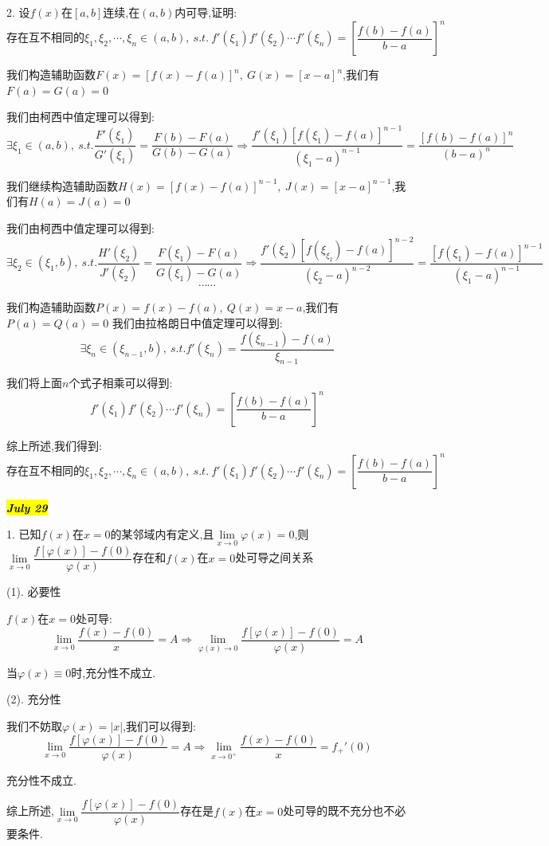 2. 设$f(x)$在$[a,b]$连续,在$(a,b)$内可导,证明: $$\text{存在互不相同的}\xi_{1},\xi_{2},\cdots,\xi_{n}\in(a,b),\ s.t. \ f'(\xi_{1})f'(\xi_{2})\cdots f'(\xi_{n})=\left[ \dfrac{f(b)-f(a)}{b-a}\right]^{n}$$
\begin{solution}
	
	我们构造辅助函数$F(x)=\left[ f(x)-f(a)\right]^n,\ G(x)=\left[ x-a\right]^n $,我们有$F(a)=G(a)=0$
	
	我们由柯西中值定理可以得到: 
	$$\exists \xi_{1}\in(a,b),\ s.t. \dfrac{F'(\xi_{1})}{G'(\xi_{1})}=\dfrac{F(b)-F(a)}{G(b)-G(a)}\Rightarrow \dfrac{f'(\xi_{1})\left[f(\xi_{1})-f(a) \right]^{n-1}}{(\xi_{1}-a)^{n-1}}=\dfrac{\left[f(b)-f(a) \right]^n }{(b-a)^n}$$
	
	我们继续构造辅助函数$H(x)=\left[ f(x)-f(a)\right]^{n-1},\ J(x)=\left[ x-a\right]^{n-1} $,我们有$H(a)=J(a)=0$
	
	我们由柯西中值定理可以得到: 
	$$\exists \xi_{2}\in(\xi_{1},b),\ s.t. \dfrac{H'(\xi_{2})}{J'(\xi_{2})}=\dfrac{F(\xi_{1})-F(a)}{G(\xi_{1})-G(a)}\Rightarrow \dfrac{f'(\xi_{2})\left[f(\xi_{\xi_{2}})-f(a) \right]^{n-2}}{(\xi_{2}-a)^{n-2}}=\dfrac{\left[f(\xi_{1})-f(a) \right]^{n-1} }{(\xi_{1}-a)^{n-1}}$$
	$$\cdots\cdots$$
	
	我们构造辅助函数$P(x)=f(x)-f(a),\ Q(x)=x-a$,我们有$P(a)=Q(a)=0$
	我们由拉格朗日中值定理可以得到: 
	$$\exists \xi_{n}\in(\xi_{n-1},b),\ s.t. f'(\xi_{n})=\dfrac{f(\xi_{n-1})-f(a)}{\xi_{n-1}}$$
	
	我们将上面$n$个式子相乘可以得到: 
	$$f'(\xi_{1})f'(\xi_{2})\cdots f'(\xi_{n})=\left[ \dfrac{f(b)-f(a)}{b-a}\right]^{n}$$
	
	综上所述,我们得到: 
	$$\text{存在互不相同的}\xi_{1},\xi_{2},\cdots,\xi_{n}\in(a,b),\ s.t. \ f'(\xi_{1})f'(\xi_{2})\cdots f'(\xi_{n})=\left[ \dfrac{f(b)-f(a)}{b-a}\right]^{n}$$
\end{solution}

\hl{\textbf{\textit{July 29}}}

1. 已知$f(x)$在$x=0$的某邻域内有定义,且$\lim\limits_{x\rightarrow 0}\varphi(x)=0$,则$\lim\limits_{x\rightarrow 0}\dfrac{f[\varphi(x)]-f(0)}{\varphi(x)}$存在和$f(x)$在$x=0$处可导之间关系
\begin{solution}
	
	(1). 必要性
	
	$f(x)$在$x=0$处可导: 
	$$\lim\limits_{x\rightarrow 0}\dfrac{f(x)-f(0)}{x}=A\Rightarrow \lim\limits_{\varphi(x)\rightarrow 0}\dfrac{f[\varphi(x)]-f(0)}{\varphi(x)}=A$$
	
	当$\varphi(x)\equiv 0$时,充分性不成立.
	
	(2). 充分性
	
	我们不妨取$\varphi(x)=|x|$,我们可以得到: 
	$$\lim\limits_{x\rightarrow 0}\dfrac{f[\varphi(x)]-f(0)}{\varphi(x)}=A\Rightarrow \lim\limits_{x\rightarrow 0^{+}}\dfrac{f(x)-f(0)}{x}=f_{+}'(0)$$
	
	充分性不成立.
	
	综上所述,$\lim\limits_{x\rightarrow 0}\dfrac{f[\varphi(x)]-f(0)}{\varphi(x)}$存在是$f(x)$在$x=0$处可导的既不充分也不必要条件.
\end{solution}

